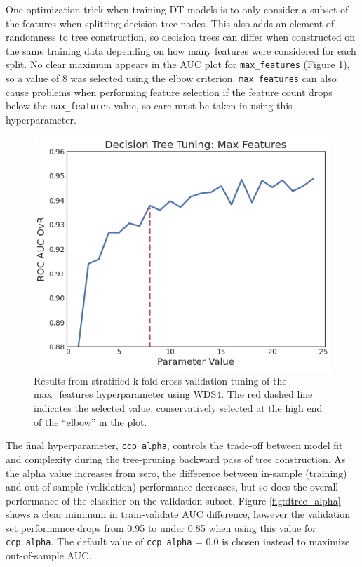 One optimization trick when training DT models is to only consider a subset of the features when splitting decision tree nodes. This also adds an element of randomness to tree construction, so decision trees can differ when constructed on the same training data depending on how many features were considered for each split. No clear maximum appears in the AUC plot for \verb|max_features| (Figure \ref{fig:dtree_max_features}), so a value of 8 was selected using the elbow criterion. \verb|max_features| can also cause problems when performing feature selection if the feature count drops below the \verb|max_features| value, so care must be taken in using this hyperparameter.

\begin{figure}[!htp]
\centering
\includegraphics[width=.6\textwidth]{templates/images/Figure-DT_tuning_max_features.png}
\caption[Decision tree max features tuning]{Results from stratified k-fold cross validation tuning of the max\_features hyperparameter using WDS4. The red dashed line indicates the selected value, conservatively selected at the high end of the ``elbow'' in the plot.}
\label{fig:dtree_max_features}
\end{figure}

The final hyperparameter, \verb|ccp_alpha|, controls the trade-off between model fit and complexity during the tree-pruning backward pass of tree construction. As the alpha value increases from zero, the difference between in-sample (training) and out-of-sample (validation) performance decreases, but so does the overall performance of the classifier on the validation subset. Figure \ref{fig:dtree_alpha} shows a clear minimum in train-validate AUC difference, however the validation set performance drops from 0.95 to under 0.85 when using this value for \verb|ccp_alpha|. The default value of \verb|ccp_alpha| = 0.0 is chosen instead to maximize out-of-sample AUC.

